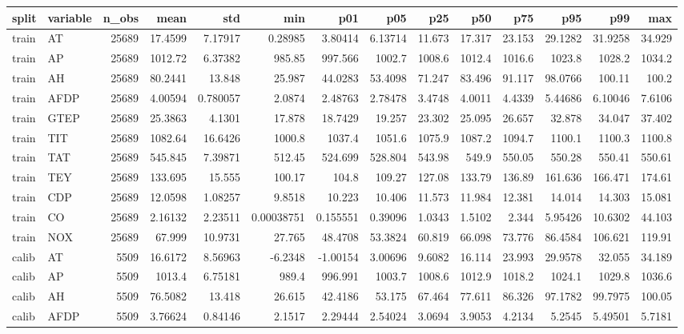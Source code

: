 \begin{tabular}{llrrrrrrrrrrrr}
\toprule
split & variable & n\_obs & mean & std & min & p01 & p05 & p25 & p50 & p75 & p95 & p99 & max \\
\midrule
train & AT & 25689 & 17.4599 & 7.17917 & 0.28985 & 3.80414 & 6.13714 & 11.673 & 17.317 & 23.153 & 29.1282 & 31.9258 & 34.929 \\
train & AP & 25689 & 1012.72 & 6.37382 & 985.85 & 997.566 & 1002.7 & 1008.6 & 1012.4 & 1016.6 & 1023.8 & 1028.2 & 1034.2 \\
train & AH & 25689 & 80.2441 & 13.848 & 25.987 & 44.0283 & 53.4098 & 71.247 & 83.496 & 91.117 & 98.0766 & 100.11 & 100.2 \\
train & AFDP & 25689 & 4.00594 & 0.780057 & 2.0874 & 2.48763 & 2.78478 & 3.4748 & 4.0011 & 4.4339 & 5.44686 & 6.10046 & 7.6106 \\
train & GTEP & 25689 & 25.3863 & 4.1301 & 17.878 & 18.7429 & 19.257 & 23.302 & 25.095 & 26.657 & 32.878 & 34.047 & 37.402 \\
train & TIT & 25689 & 1082.64 & 16.6426 & 1000.8 & 1037.4 & 1051.6 & 1075.9 & 1087.2 & 1094.7 & 1100.1 & 1100.3 & 1100.8 \\
train & TAT & 25689 & 545.845 & 7.39871 & 512.45 & 524.699 & 528.804 & 543.98 & 549.9 & 550.05 & 550.28 & 550.41 & 550.61 \\
train & TEY & 25689 & 133.695 & 15.555 & 100.17 & 104.8 & 109.27 & 127.08 & 133.79 & 136.89 & 161.636 & 166.471 & 174.61 \\
train & CDP & 25689 & 12.0598 & 1.08257 & 9.8518 & 10.223 & 10.406 & 11.573 & 11.984 & 12.381 & 14.014 & 14.303 & 15.081 \\
train & CO & 25689 & 2.16132 & 2.23511 & 0.00038751 & 0.155551 & 0.39096 & 1.0343 & 1.5102 & 2.344 & 5.95426 & 10.6302 & 44.103 \\
train & NOX & 25689 & 67.999 & 10.9731 & 27.765 & 48.4708 & 53.3824 & 60.819 & 66.098 & 73.776 & 86.4584 & 106.621 & 119.91 \\
calib & AT & 5509 & 16.6172 & 8.56963 & -6.2348 & -1.00154 & 3.00696 & 9.6082 & 16.114 & 23.993 & 29.9578 & 32.055 & 34.189 \\
calib & AP & 5509 & 1013.4 & 6.75181 & 989.4 & 996.991 & 1003.7 & 1008.6 & 1012.9 & 1018.2 & 1024.1 & 1029.8 & 1036.6 \\
calib & AH & 5509 & 76.5082 & 13.418 & 26.615 & 42.4186 & 53.175 & 67.464 & 77.611 & 86.326 & 97.1782 & 99.7975 & 100.05 \\
calib & AFDP & 5509 & 3.76624 & 0.84146 & 2.1517 & 2.29444 & 2.54024 & 3.0694 & 3.9053 & 4.2134 & 5.2545 & 5.49501 & 5.7181 \\

\end{tabular}
